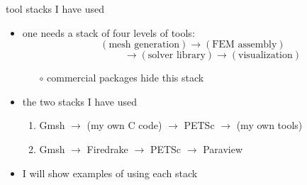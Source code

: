 \documentclass[hide notes,intlimits,usenames,dvipsnames]{beamer}
\begin{document}
\begin{frame}{tool stacks I have used}

\begin{itemize}
\item one needs a stack of four levels of tools:
    $$(\text{mesh generation}) \to (\text{FEM assembly})$$
    $$\qquad\qquad \to (\text{solver library}) \to (\text{visualization})$$

    \vspace{-1mm}
    \begin{itemize}
    \item[$\circ$] commercial packages hide this stack
    \end{itemize}
\item the two stacks I have used
    \begin{enumerate}
    \item Gmsh $\to$ (my own C code) $\to$ PETSc $\to$ (my own tools)
    \item Gmsh $\to$ Firedrake $\to$ PETSc $\to$ Paraview
    \end{enumerate}
\item I will show examples of using each stack
\end{itemize}
\end{frame}
\end{document}
